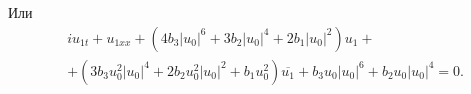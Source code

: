 \documentclass[preprint,12pt]{article}
\begin{document}
Или
\begin{equation}
\begin{split}
&iu_{1t}+u_{1xx}+\left(4 b_{3} {| u_{0}|}^{6}+3 b_{2} {| u_{0}|}^{4}+2 b_{1} {| u_{0}|}^{2}\right) u_{1}+\\
&+\left(3 b_{3} u_{0}^{2} {| u_{0}|}^{4}
+2 b_{2} u_{0}^{2} {| u_{0}|}^{2}+b_{1} u_{0}^{2}\right) \overline{u_{1}}+b_{3} u_{0} {| u_{0}|}^{6}+b_{2} u_{0} {| u_{0}|}^{4}=0.
\end{split}
\end{equation}
\end{document}
